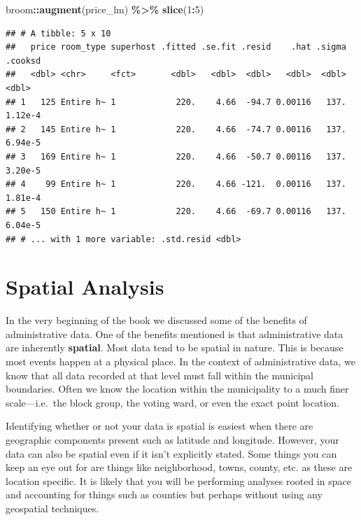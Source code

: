 \documentclass[
]{book}
\newenvironment{Shaded}{\begin{snugshade}}{\end{snugshade}}
\newcommand{\DecValTok}[1]{\textcolor[rgb]{0.00,0.00,0.81}{#1}}
\newcommand{\KeywordTok}[1]{\textcolor[rgb]{0.13,0.29,0.53}{\textbf{#1}}}
\newcommand{\NormalTok}[1]{#1}
\newcommand{\OperatorTok}[1]{\textcolor[rgb]{0.81,0.36,0.00}{\textbf{#1}}}
\newcommand{\StringTok}[1]{\textcolor[rgb]{0.31,0.60,0.02}{#1}}
\begin{document}
\begin{Shaded}
\begin{Highlighting}[]
\NormalTok{broom}\OperatorTok{::}\KeywordTok{augment}\NormalTok{(price\_lm) }\OperatorTok{\%\textgreater{}\%}\StringTok{ }
\StringTok{  }\KeywordTok{slice}\NormalTok{(}\DecValTok{1}\OperatorTok{:}\DecValTok{5}\NormalTok{)}
\end{Highlighting}
\end{Shaded}

\begin{verbatim}
## # A tibble: 5 x 10
##   price room_type superhost .fitted .se.fit .resid    .hat .sigma .cooksd
##   <dbl> <chr>     <fct>       <dbl>   <dbl>  <dbl>   <dbl>  <dbl>   <dbl>
## 1   125 Entire h~ 1            220.    4.66  -94.7 0.00116   137. 1.12e-4
## 2   145 Entire h~ 1            220.    4.66  -74.7 0.00116   137. 6.94e-5
## 3   169 Entire h~ 1            220.    4.66  -50.7 0.00116   137. 3.20e-5
## 4    99 Entire h~ 1            220.    4.66 -121.  0.00116   137. 1.81e-4
## 5   150 Entire h~ 1            220.    4.66  -69.7 0.00116   137. 6.04e-5
## # ... with 1 more variable: .std.resid <dbl>
\end{verbatim}

\hypertarget{spatial-analysis}{%
\chapter{Spatial Analysis}\label{spatial-analysis}}

In the very beginning of the book we discussed some of the benefits of administrative data. One of the benefits mentioned is that administrative data are inherently \textbf{spatial}. Most data tend to be spatial in nature. This is because most events happen at a physical place. In the context of administrative data, we know that all data recorded at that level must fall within the municipal boundaries. Often we know the location within the municipality to a much finer scale---i.e.~the block group, the voting ward, or even the exact point location.

Identifying whether or not your data is spatial is easiest when there are geographic components present such as latitude and longitude. However, your data can also be spatial even if it isn't explicitly stated. Some things you can keep an eye out for are things like neighborhood, towns, county, etc. as these are location specific. It is likely that you will be performing analyses rooted in space and accounting for things such as counties but perhaps without using any geospatial techniques.
\end{document}
